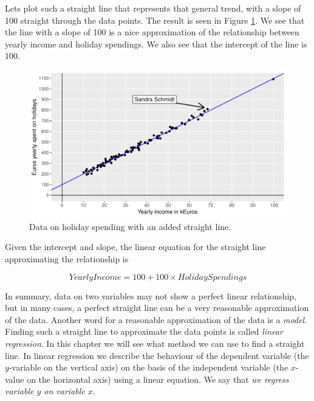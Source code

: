 \documentclass[]{book}\usepackage[]{graphicx}\usepackage[]{color}
\makeatletter
\def\maxwidth{ %
  \ifdim\Gin@nat@width>\linewidth
    \linewidth
  \else
    \Gin@nat@width
  \fi
}
\newenvironment{knitrout}{}{} %
\makeatother
\begin{document}
Lets plot such a straight line that represents that general trend, with a slope of 100 straight through the data points. The result is seen in Figure \ref{fig:lm_9}. We see that the line with a slope of 100 is a nice approximation of the relationship between yearly income and holiday spendings. We also see that the intercept of the line is 100.

\begin{knitrout}
\color{fgcolor}\begin{figure}

{\centering \includegraphics[width=\maxwidth]{figure/lm_9-1} 

}

\caption[Data on holiday spending with an added straight line]{Data on holiday spending with an added straight line.}\label{fig:lm_9}
\end{figure}


\end{knitrout}

Given the intercept and slope, the linear equation for the straight line approximating the relationship is

\begin{equation}
YearlyIncome = 100 + 100 \times HolidaySpendings
\end{equation}

In summary, data on two variables may not show a perfect linear relationship, but in many cases, a perfect straight line can be a very reasonable approximation of the data. Another word for a reasonable approximation of the data is a \textit{model}. Finding such a straight line to approximate the data points is called \textit{linear regression}. In this chapter we will see what method we can use to find a straight line. In linear regression we describe the behaviour of the dependent variable (the $y$-variable on the vertical axis) on the basis of the independent variable (the $x$-value on the horizontal axis) using a linear equation. We say that \textit{we regress variable $y$ on variable $x$}.
\end{document}
